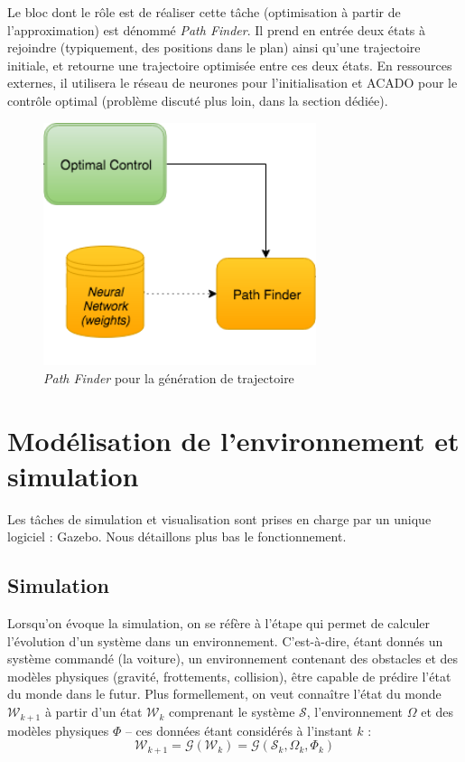 \documentclass[a4paper,12pt]{report}
\begin{document}
Le bloc dont le rôle est de réaliser cette tâche (optimisation à partir de l'approximation) est dénommé \textit{Path Finder}. Il prend en entrée deux états à rejoindre (typiquement, des positions dans le plan) ainsi qu'une trajectoire initiale, et retourne une trajectoire optimisée entre ces deux états. En ressources externes, il utilisera le réseau de neurones pour l'initialisation et ACADO pour le contrôle optimal (problème discuté plus loin, dans la section dédiée).

\begin{figure}[!htb]
\centering
\includegraphics[width=8cm]{pathfinder.png}
\caption{\textit{Path Finder} pour la génération de trajectoire}
\end{figure}





\newpage
\section{Modélisation de l'environnement et simulation}
Les tâches de simulation et visualisation sont prises en charge par un unique logiciel : Gazebo. Nous détaillons plus bas le fonctionnement.

\subsection{Simulation}
Lorsqu'on évoque la simulation, on se réfère à l'étape qui permet de calculer l'évolution d'un système dans un environnement. C'est-à-dire, étant donnés un système commandé (la voiture), un environnement contenant des obstacles et des modèles physiques (gravité, frottements, collision), être capable de prédire l'état du monde dans le futur. Plus formellement, on veut connaître l'état du monde $\mathcal{W}_{k+1}$ à partir d'un état $\mathcal{W}_k$ comprenant le système $\mathcal{S}$, l'environnement $\Omega$ et des modèles physiques $\Phi$ -- ces données étant considérés à l'instant $k$ :
$$ \mathcal{W}_{k+1} = \mathcal{G}( \mathcal{W}_k) = \mathcal{G}(\mathcal{S}_k, \Omega_k, \Phi_k )$$
\end{document}
